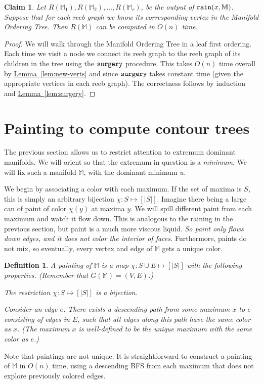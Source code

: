 \documentclass[11pt]{article}
\newtheorem{claim}[theorem]{Claim}
\newtheorem{definition}[theorem]{Definition}
\theoremstyle{definition}
\newcommand{\MM}{\mathbb{M}}
\newcommand{\Lem}[1]{\hyperref[lem:#1]{Lemma~\ref*{lem:#1}}} %
\newcommand{\rain}{{\tt rain}}
\newcommand{\reeb}{R}
\newcommand{\surgery}{{\tt surgery}}
\begin{document}

\begin{claim} \label{clm:rain-reeb} Let $\reeb(\MM_1), \reeb(\MM_2), \ldots, \reeb(\MM_r)$, 
be the output of $\rain(x,\MM)$. Suppose that for each reeb graph we know its corresponding vertex in the Manifold Ordering Tree. 
Then $\reeb(\MM)$ can be computed in $O(n)$ time.
\end{claim}

\begin{proof}
We will walk through the Manifold Ordering Tree in a leaf first ordering.  Each time we visit a node we connect its reeb graph to the 
reeb graph of its children in the tree using the $\surgery$ procedure. This takes $O(n)$ time overall by \Lem{new-verts} and since $\surgery$ takes constant time (given the appropriate vertices in each reeb graph).  The correctness follows by induction and  \Lem{surgery}.
\end{proof}

\section{Painting to compute contour trees} \label{sec:paint}
The previous section allows us to restrict attention to extremum dominant manifolds.
We will orient so that the extremum in question is a \emph{minimum}.
We will fix such a manifold $\MM$, with the dominant minimum $u$. 

We begin by associating a color with each maximum. If the set of maxima is $S$,
this is simply an arbitrary bijection $\chi:S \mapsto [|S|]$. Imagine there being a large
can of paint of color $\chi(y)$ at maxima $y$. We will spill different paint from each maximum and watch it flow down.
This is analogous to the raining in the previous section, but paint is a much more viscous liquid.
\emph{So paint only flows down edges, and it does not color the interior of faces.} Furthermore, paints
do not mix, so eventually, every vertex and edge of $\MM$ gets a unique color.
%
\begin{definition} \label{def:paint} A  \emph{painting} of $\MM$ is a map $\chi:S \cup E \mapsto [|S|]$
with the following properties. (Remember that $G(\MM) = (V,E)$.)
\begin{asparaitem}
	\item The restriction $\chi:S \mapsto [|S|]$ is a bijection.
	\item Consider an edge $e$. There exists a descending path from some maximum $x$ to $e$
	consisting of edges in $E$, such that all edges along this path have the same color as $x$. (The maximum $x$
	is well-defined to be the unique maximum with the same color as $e$.)
\end{asparaitem}
\end{definition}
%
Note that paintings are not unique. It is straightforward to construct a painting of $\MM$ in $O(n)$ time, using a descending BFS from each maximum that does not explore previously colored edges. 
\end{document}
